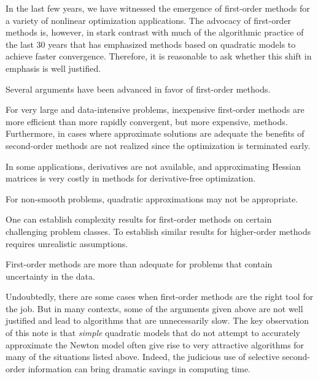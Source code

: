 \documentclass{optima}
\begin{document}
   




\noindent
In the last few years, we have witnessed the emergence of first-order methods for a
variety of nonlinear optimization applications. The advocacy of first-order methods
is, however, in stark contrast with much of the algorithmic practice of the last 30
years that has emphasized methods based on quadratic models to achieve faster
convergence. Therefore, it is reasonable to ask whether this shift in emphasis is well
justified.

Several arguments have been advanced in favor of first-order methods. 
 
\begin{compactenum}[1.]
\item For very large and data-intensive problems, inexpensive first-order methods are more
efficient than more rapidly convergent, but more expensive, methods. Furthermore, in
cases where approximate solutions are adequate the benefits of second-order methods
are not realized since the optimization is terminated early.
\item In some applications, derivatives are not available, and approximating Hessian
matrices is very costly in methods for derivative-free optimization.
\item  For non-smooth problems, quadratic approximations may not be appropriate.
\item One can establish complexity results for first-order methods on certain challenging problem classes. To establish similar results for higher-order methods requires unrealistic assumptions.
\item First-order methods are more than adequate for problems that contain uncertainty
in the data. 
\end{compactenum}
%
Undoubtedly, there are some cases when first-order methods are the right tool for the
job. But in many contexts, some of the arguments given above are not well justified
and lead to algorithms that are unnecessarily slow. The key observation of this note
is that \emph{simple} quadratic models that do not attempt to accurately approximate
the Newton model often give rise to very attractive algorithms for many of the
situations listed above. Indeed, the judicious use of selective second-order
information can bring dramatic savings in computing time.
\end{document}
